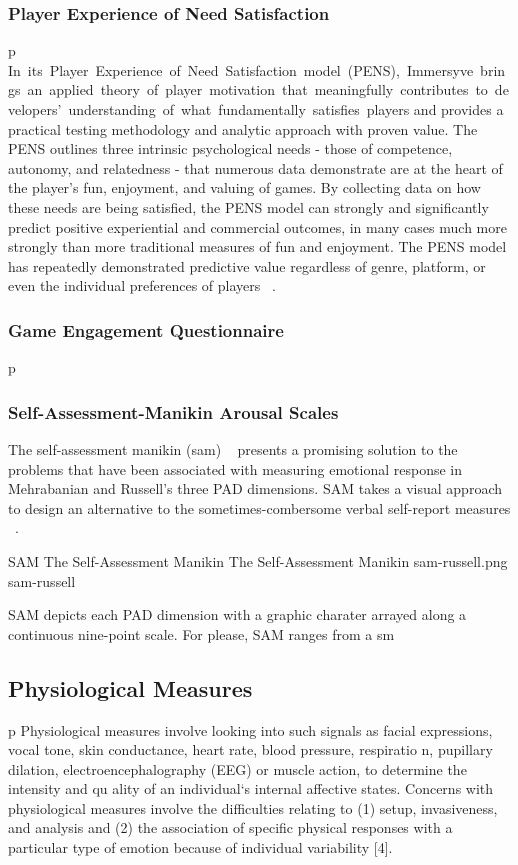 \documentclass{uofsthesis-cs}
\begin{document}
\subsubsection{Player Experience of Need Satisfaction}
p In its Player Experience of Need Satisfaction model (PENS), Immersyve brings an applied theory of player motivation that meaningfully contributes to developers’ understanding of what fundamentally satisfies players and provides a practical testing methodology and analytic approach with proven value. The PENS outlines three  intrinsic psychological needs - those of competence, autonomy, and relatedness - that numerous data  demonstrate are at the heart of the player's fun, enjoyment, and valuing of games. By collecting data on how  these needs are being satisfied, the PENS model can strongly and significantly predict positive experiential and  commercial outcomes, in many cases much more strongly than more traditional measures of fun and  enjoyment. The PENS model has repeatedly demonstrated predictive value regardless of genre, platform, or even the individual preferences of players ~\cite{rigby2007pens}.

\subsubsection{Game Engagement Questionnaire}
p 

\subsubsection{Self-Assessment-Manikin Arousal Scales}
The self-assessment manikin (sam) ~\cite{lang1985cognitive} presents a promising solution to the problems that have been associated with measuring emotional response in Mehrabanian and Russell's three PAD dimensions. SAM takes a visual approach to design an alternative to the sometimes-combersome verbal self-report measures ~\cite{lang1985cognitive}.

\img
{SAM The Self-Assessment Manikin}
{The Self-Assessment Manikin}
{sam-russell.png}
{sam-russell}

SAM depicts each PAD dimension with a graphic charater arrayed along a continuous nine-point scale. For please, SAM ranges from a sm
\subsection{Physiological Measures}

p Physiological measures involve looking into such signals as facial expressions, vocal tone, skin conductance, heart rate, blood pressure, respiratio n, pupillary dilation, electroencephalography (EEG) or muscle action, to determine the intensity and qu ality of an individual‘s internal affective states. Concerns with physiological measures involve the difficulties relating to (1) setup, invasiveness, and analysis and (2) the association of specific physical responses with a particular type of emotion because of individual variability [4].
\end{document}
